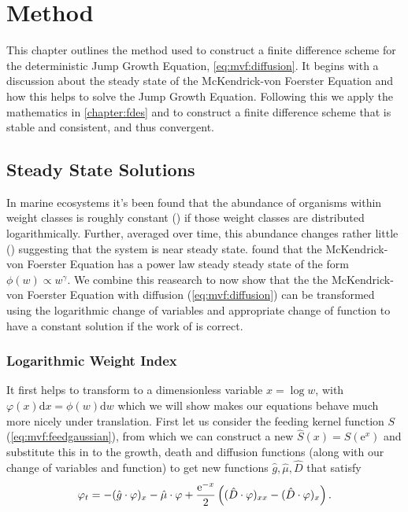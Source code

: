 \documentclass[../main.tex]{subfiles}
\begin{document}
  \chapter{Method}\label{chapter:method}
  This chapter outlines the method used to construct a finite difference scheme for the deterministic Jump Growth Equation, \autoref{eq:mvf:diffusion}. It begins with a discussion about the steady state of the McKendrick-von Foerster Equation and how this helps to solve the Jump Growth Equation. Following this we apply the mathematics in \autoref{chapter:fdes} and \cite{rosinger2008} to construct a finite difference scheme that is stable and consistent, and thus convergent.


  \section{Steady State Solutions}\label{sec:met:steadystate}
  In marine ecosystems it's been found that the abundance of organisms within weight classes is roughly constant (\cite{sheldon1972}) if those weight classes are distributed logarithmically. Further, averaged over time, this abundance changes rather little (\cite{datta2011}) suggesting that the system is near steady state. \cite{benoit2004} found that the McKendrick-von Foerster Equation has a power law steady steady state of the form $\phi(w) \propto w^{\gamma}$. We combine this reasearch to now show that the the McKendrick-von Foerster Equation with diffusion (\autoref{eq:mvf:diffusion}) can be transformed using the logarithmic change of variables and appropriate change of function to have a constant solution if the work of \cite{benoit2004} is correct.

  \subsection{Logarithmic Weight Index}
  It first helps to transform to a dimensionless variable $x = \log{w}$, with $\varphi(x) \mathrm{d}x = \phi(w) \mathrm{d}w$ which we will show makes our equations behave much more nicely under translation. First let us consider the feeding kernel function $S$ (\autoref{eq:mvf:feedgaussian}), from which we can construct a new $\hat{S}(x) = S(\mathrm{e}^x)$ and substitute this in to the growth, death and diffusion functions (along with our change of variables and function) to get new functions $\hat{g}, \hat{\mu}, \hat{D}$ that satisfy
  \begin{equation}
    \varphi_t = - (\hat{g} \cdot \varphi)_x - \hat{\mu} \cdot \varphi + \frac{\operatorname{e}^{-x}}{2}\left(( \hat{D}\cdot \varphi)_{xx} - (\hat{D} \cdot \varphi)_x \right).
  \end{equation}
\end{document}
